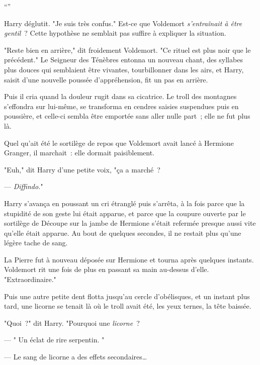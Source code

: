 “”

Harry déglutit. "Je suis très confus." Est-ce que Voldemort \emph{s'entraînait à être gentil}~? Cette hypothèse ne semblait pas suffire à expliquer la situation.

"Reste bien en arrière," dit froidement Voldemort. "Ce rituel est plus noir que le précédent." Le Seigneur des Ténèbres entonna un nouveau chant, des syllabes plus douces qui semblaient être vivantes, tourbillonner dans les airs, et Harry, saisit d'une nouvelle poussée d'appréhension, fit un pas en arrière.

Puis il cria quand la douleur rugit dans sa cicatrice. Le troll des montagnes s'effondra sur lui-même, se transforma en cendres saisies suspendues puis en poussière, et celle-ci sembla être emportée sans aller nulle part~; elle ne fut plus là.

Quel qu'ait été le sortilège de repos que Voldemort avait lancé à Hermione Granger, il marchait~: elle dormait paisiblement.

"Euh," dit Harry d'une petite voix, "ça a marché~?

--- \emph{Diffindo.}"

Harry s'avança en poussant un cri étranglé puis s'arrêta, à la fois parce que la stupidité de son geste lui était apparue, et parce que la coupure ouverte par le sortilège de Découpe sur la jambe de Hermione s'était refermée presque aussi vite qu'elle était apparue. Au bout de quelques secondes, il ne restait plus qu'une légère tache de sang.

La Pierre fut à nouveau déposée sur Hermione et tourna après quelques instants. Voldemort rit une fois de plus en passant sa main au-dessus d'elle. "Extraordinaire."

Puis une autre petite dent flotta jusqu'au cercle d'obélisques, et un instant plus tard, une licorne se tenait là où le troll avait été, les yeux ternes, la tête baissée.

"Quoi~?" dit Harry. "Pourquoi une \emph{licorne}~?

--- " Un éclat de rire serpentin. "

--- Le sang de licorne a des effets secondaires…

